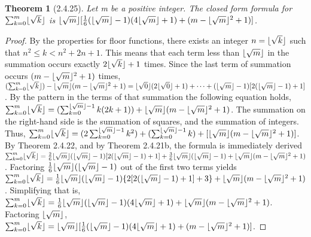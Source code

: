 \documentclass[a4paper, 12pt]{article}
\theoremstyle{plain}
\newtheorem*{theorem*}{Theorem}
\DeclarePairedDelimiter{\floor}{\lfloor}{\rfloor}
\begin{document}
	
	\begin{theorem*}[2.4.25]
		Let m be a positive integer. The closed form formula for $\sum_{k=0}^{m} \floor{\sqrt{k}}$ is $\floor{\sqrt{m}}[\frac{1}{6}(\floor{\sqrt{m}}-1)(4\floor{\sqrt{m}}+1) + (m - \floor{\sqrt{m}}^{2} + 1)]$.
	\end{theorem*}
	
	\begin{proof}
		By the properties for floor functions, there exists an integer $n = \floor{\sqrt{k}}$ such that $n^{2} \le k < n^{2} + 2n + 1$. This means that each term less than $\floor{\sqrt{m}}$ in the summation occurs exactly $2\floor{\sqrt{k}}+1$ times. Since the last term of summation occurs $(m - \floor{\sqrt{m}}^{2} + 1)$ times, \newline $(\sum_{k=0}^{m} \floor{\sqrt{k}}) - \floor{\sqrt{m}}(m - \floor{\sqrt{m}}^{2} + 1) = \newline  \floor{\sqrt{0}}(2\floor{\sqrt{0}} + 1) + \dots + (\floor{\sqrt{m}}-1)[2(\floor{\sqrt{m}}-1) + 1]$. By the pattern in the terms of that summation the following equation holds, $\sum_{k=0}^{m} \floor{\sqrt{k}} = \newline (\sum_{k=0}^{\floor{\sqrt{m}}-1} k(2k + 1)) + \floor{\sqrt{m}}(m - \floor{\sqrt{m}}^{2} + 1)$. The summation on the right-hand side is the summation of squares, and the summation of integers. Thus, $\sum_{k=0}^{m} \floor{\sqrt{k}} = (2\sum_{k=0}^{\floor{\sqrt{m}}-1} k^{2}) + (\sum_{k=0}^{\floor{\sqrt{m}}-1} k) + [\floor{\sqrt{m}}(m - \floor{\sqrt{m}}^{2} + 1)]$. By Theorem 2.4.22, and by Theorem 2.4.21b, the formula is immediately derived $\sum_{k=0}^{m} \floor{\sqrt{k}} = \frac{2}{6}\floor{\sqrt{m}}(\floor{\sqrt{m}}-1)[2(\floor{\sqrt{m}}-1)+1] + \frac{3}{6}\floor{\sqrt{m}}(\floor{\sqrt{m}}-1) + \floor{\sqrt{m}}(m - \floor{\sqrt{m}}^{2} + 1)$. Factoring $\frac{1}{6}\floor{\sqrt{m}}(\floor{\sqrt{m}}-1)$ out of the first two terms yields $\sum_{k=0}^{m} \floor{\sqrt{k}} = \frac{1}{6}\floor{\sqrt{m}}(\floor{\sqrt{m}}-1)\{2[2(\floor{\sqrt{m}}-1)+1] +3\}+\floor{\sqrt{m}}(m - \floor{\sqrt{m}}^{2} + 1)$. Simplifying that is, $\sum_{k=0}^{m} \floor{\sqrt{k}} = \newline \frac{1}{6}\floor{\sqrt{m}}(\floor{\sqrt{m}}-1)(4\floor{\sqrt{m}} + 1) +\floor{\sqrt{m}}(m - \floor{\sqrt{m}}^{2} + 1)$. Factoring $\floor{\sqrt{m}}$, \newline $\sum_{k=0}^{m} \floor{\sqrt{k}} = \floor{\sqrt{m}}[\frac{1}{6}(\floor{\sqrt{m}}-1)(4\floor{\sqrt{m}}+1) + (m - \floor{\sqrt{m}}^{2} + 1)]$.
	\end{proof}
\end{document}
